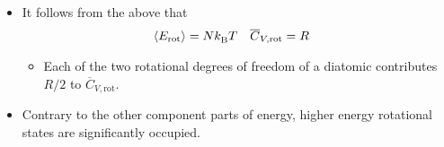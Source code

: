 \documentclass[../notes.tex]{subfiles}
\begin{document}
\begin{itemize}
\begin{itemize}
    \end{itemize}
    \item It follows from the above that
    \begin{align*}
        \left\langle{E_\text{rot}}\right\rangle &= N{k_\text{B}^{}} T&
        \overline{C}_{V,\text{rot}} &= R
    \end{align*}
    \begin{itemize}
        \item Each of the two rotational degrees of freedom of a diatomic contributes $R/2$ to $\overline{C}_{V,\text{rot}}$.
    \end{itemize}
    \item Contrary to the other component parts of energy, higher energy rotational states are significantly occupied.
    \begin{figure}[h!]
        \centering
\end{figure}
\end{itemize}
\end{document}
